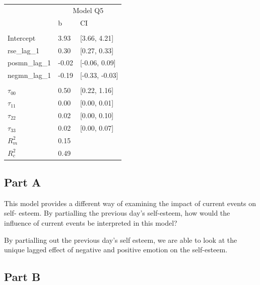 \documentclass[]{article}
\begin{document}
\begin{table}[H]
\centering
\begin{tabular}{lll}
\toprule
\multicolumn{1}{c}{ } & \multicolumn{2}{c}{Model Q5} \\
\cmidrule(l{2pt}r{2pt}){2-3}
 & b & CI\\
\midrule
\addlinespace[0.3em]
\multicolumn{3}{l}{\textbf{Fixed}}\\
\hspace{1em}Intercept & 3.93 & [3.66, 4.21]\\
\hspace{1em}rse\_lag\_1 & 0.30 & [0.27, 0.33]\\
\hspace{1em}posmn\_lag\_1 & -0.02 & [-0.06, 0.09]\\
\hspace{1em}negmn\_lag\_1 & -0.19 & [-0.33, -0.03]\\
\addlinespace[0.3em]
\multicolumn{3}{l}{\textbf{Random}}\\
\hspace{1em}$\tau_{00}$ & 0.50 & [0.22, 1.16]\\
\hspace{1em}$\tau_{11}$ & 0.00 & [0.00, 0.01]\\
\hspace{1em}$\tau_{22}$ & 0.02 & [0.00, 0.10]\\
\hspace{1em}$\tau_{33}$ & 0.02 & [0.00, 0.07]\\
$R^2_m$ & 0.15 & \\
$R^2_c$ & 0.49 & \\
\bottomrule
\end{tabular}
\end{table}

\subsection{Part A}\label{part-a-3}

This model provides a different way of examining the impact of current
events on self- esteem. By partialling the previous day's self-esteem,
how would the influence of current events be interpreted in this model?

By partialling out the previous day's self esteem, we are able to look
at the unique lagged effect of negative and positive emotion on the
self-esteem.

\subsection{Part B}\label{part-b-3}
\end{document}
